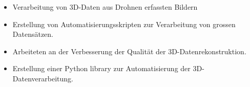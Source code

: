 \dottedline
{}
\begin{itemize}
    \item Verarbeitung von 3D-Daten aus Drohnen erfassten Bildern
    \item Erstellung von Automatisierungsskripten zur Verarbeitung von grossen Datensätzen.
    \item Arbeiteten an der Verbesserung der Qualität der 3D-Datenrekonstruktion.
    \item Erstellung einer Python library zur Automatisierung der 3D-Datenverarbeitung.
\end{itemize}
